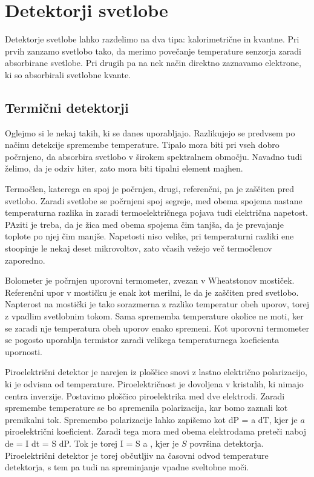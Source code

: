 
\chapter{Detektorji svetlobe}

Detektorje svetlobe lahko razdelimo na dva tipa: kalorimetrične in kvantne. Pri prvih
zanzamo svetlobo tako, da merimo povečanje temperature senzorja zaradi absorbirane svetlobe.
Pri drugih pa na nek način direktno zaznavamo elektrone, ki so absorbirali svetlobne kvante.

\section{Termični detektorji}
Oglejmo si le  nekaj takih, ki se danes uporabljajo. Razlikujejo se predvsem po načinu
detekcije spremembe temperature. Tipalo mora biti pri vseh dobro počrnjeno, da absorbira
svetlobo v širokem spektralnem območju. Navadno tudi želimo, da je odziv hiter, zato mora 
biti tipalni element majhen.

Termočlen, katerega en spoj je počrnjen, drugi, referenčni, pa je zaščiten pred svetlobo.
Zaradi svetlobe se počrnjeni spoj segreje, med obema spojema nastane temperaturna razlika in 
zaradi termoelektričnega pojava tudi električna napetost. PAziti je treba, da je žica med 
obema spojema čim tanjša, da je prevajanje toplote po njej čim manjše. Napetosti niso velike,
pri temperaturni razliki ene stoopinje le nekaj deset mikrovoltov, zato včasih vežejo 
več termočlenov zaporedno.

Bolometer je počrnjen uporovni termometer, zvezan v Wheatstonov mostiček. Referenčni upor v
mostičku je enak kot merilni, le da je zaščiten pred svetlobo. Napterost na mostički je tako 
sorazmerna z razliko temperatur obeh uporov, torej z vpadlim svetlobnim tokom. Sama
sprememba temperature okolice ne moti, ker se zaradi nje temperatura obeh uporov enako spremeni. 
Kot uporovni termometer se pogosto uporablja termistor zaradi velikega temperaturnega koeficienta
upornosti.

Piroelektrični detektor je narejen iz ploščice snovi z lastno električno polarizacijo, ki 
je odvisna od temperature. Piroelektričnost  je dovoljena v kristalih, ki nimajo centra 
inverzije. Postavimo ploščico piroelektrika med dve elektrodi. Zaradi spremembe temperature se 
bo spremenila polarizacija, kar bomo zaznali kot premikalni tok. Spremembo polarizacije lahko zapišemo
kot 
\beq
dP = a dT,
\eeq
kjer je $a$ piroelektrični koeficient. Zaradi tega mora med obema elektrodama preteči naboj
\beq
de = I dt = S dP.
\eeq
Tok je torej
\beq
I = S a ,
\eeq
kjer je $S$ površina detektorja. Piroelektrični detektor je torej občutljiv na časovni
odvod temperature detektorja, s tem pa tudi na spreminjanje vpadne sveltobne moči. 

